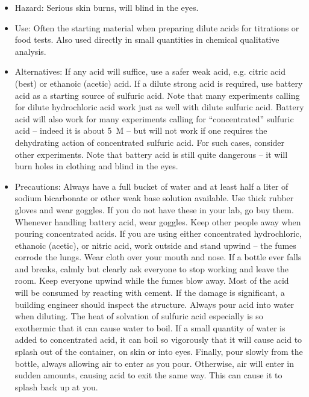 \begin{itemize}

\item{Hazard: Serious skin burns, will blind in the eyes.}

\item{Use: Often the starting material 
when preparing dilute acids for titrations or food tests. 
Also used directly in small quantities in chemical qualitative analysis.}

\item{Alternatives: If any acid will suffice, use a safer weak acid, 
e.g. citric acid (best) or ethanoic (acetic) acid. 
If a dilute strong acid is required, 
use battery acid as a starting source of sulfuric acid. 
Note that many experiments calling for dilute hydrochloric acid 
work just as well with dilute sulfuric acid. 
Battery acid will also work for many experiments 
calling for “concentrated” sulfuric acid – 
indeed it is about 5~M – but will not work if one requires 
the dehydrating action of concentrated sulfuric acid. 
For such cases, consider other experiments. 
Note that battery acid is still quite dangerous – 
it will burn holes in clothing and blind in the eyes.}

\item{Precautions: Always have a full bucket of water 
and at least half a liter of sodium bicarbonate 
or other weak base solution available. 
Use thick rubber gloves and wear goggles. 
If you do not have these in your lab, go buy them. 
Whenever handling battery acid, wear goggles. 
Keep other people away when pouring concentrated acids. 
If you are using either concentrated hydrochloric, ethanoic (acetic), 
or nitric acid, work outside and stand upwind -- the fumes corrode the lungs. 
Wear cloth over your mouth and nose. 
If a bottle ever falls and breaks, 
calmly but clearly ask everyone to stop working and leave the room. 
Keep everyone upwind while the fumes blow away. 
Most of the acid will be consumed by reacting with cement. 
If the damage is significant, a building engineer should inspect the structure. 
Always pour acid into water when diluting. 
The heat of solvation of sulfuric acid especially is so exothermic 
that it can cause water to boil. 
If a small quantity of water is added to concentrated acid, 
it can boil so vigorously that it will cause acid to splash 
out of the container, on skin or into eyes. 
Finally, pour slowly from the bottle, 
always allowing air to enter as you pour. 
Otherwise, air will enter in sudden amounts, 
causing acid to exit the same way. 
This can cause it to splash back up at you.}


\end{itemize}
